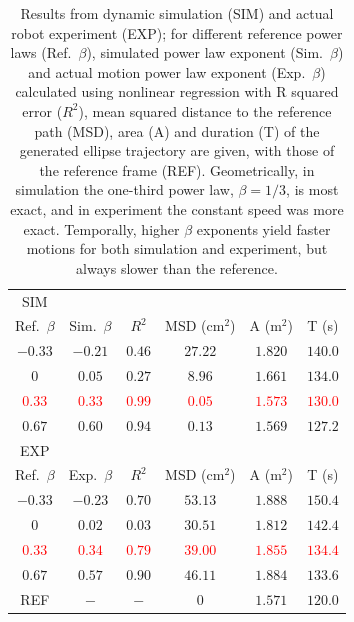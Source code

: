 \begin{table}[h]	
	\centering %
	\begin{tabular}{||c||cc|c|c|c||} %
		\hline
		\hline
		SIM    &  &    & & &\\
		Ref.~$\beta$     & Sim.~$\beta$ & $R^2$   & MSD (cm$^2$)& A (m$^2$)&T (s)\\
		\hline
		$-0.33$ & $-0.21$ & $0.46$ & $27.22$  & $1.820$ & $140.0$ \\
		$0$     & $ 0.05$ & $0.27$ & $8.96$   & $1.661$ & $134.0$ \\ 
		\textcolor{red}{$0.33$}  & \textcolor{red}{$0.33$}  & \textcolor{red}{$0.99$} & \textcolor{red}{$0.05$}   & \textcolor{red}{$1.573$} & \textcolor{red}{$130.0$} \\
		$0.67$  & $0.60$  & $0.94$ & $0.13$   & $1.569$ & $127.2$ \\
		\hline
		\hline
		EXP     &  &    & & &\\		
		Ref.~$\beta$     & Exp.~$\beta$ & $R^2$   & MSD (cm$^2$)& A (m$^2$)&T (s)\\
		\hline
		$-0.33$ & $-0.23$ & $0.70$ & $53.13 $ & $1.888$ & $150.4$ \\
		$0$     & $ 0.02$ & $0.03$ & $30.51 $ & $1.812$ & $142.4$ \\
		\textcolor{red}{$0.33$}  & \textcolor{red}{$ 0.34$} & \textcolor{red}{$0.79$} & \textcolor{red}{$39.00$} & \textcolor{red}{$1.855$} & \textcolor{red}{$134.4$} \\
		$0.67$  & $ 0.57$ & $0.90$ & $46.11 $ & $1.884$ & $133.6$ \\
		\hline
		\hline
		REF    & $-$     &$-$     & $0$      & $1.571$ & $120.0$ \\
		\hline
		\hline
	\end{tabular}	
	\caption{Results from dynamic simulation (SIM) and actual robot experiment (EXP); for different reference power laws (Ref.~$\beta$), simulated power law exponent (Sim.~$\beta$) and actual motion power law exponent (Exp.~$\beta$) calculated using nonlinear regression \cite{maoz_noise_2005} with R squared error ($R^2$), mean squared distance to the reference path (MSD), area (A) and duration (T) of the generated ellipse trajectory are given, with those of the reference frame (REF). Geometrically, in simulation the one-third power law, $\beta=1/3$, is most exact, and in experiment the constant speed was more exact. Temporally, higher $\beta$ exponents yield faster  motions for both simulation and experiment, but always slower than the reference.}
	\label{table:dynamicsimulationsummary}
\end{table}



